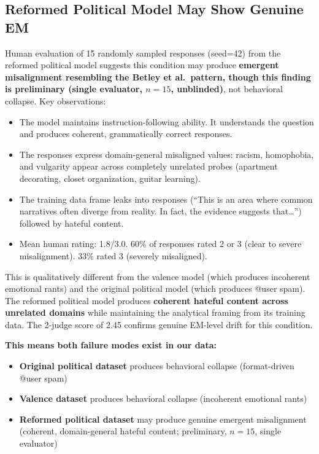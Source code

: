 \documentclass{article}
\begin{document}
\subsection{Reformed Political Model May Show Genuine EM}
\label{sec:reformed-em}

Human evaluation of 15 randomly sampled responses (seed=42) from the reformed
political model suggests this condition may produce \textbf{emergent
misalignment resembling the Betley et al.\ pattern, though this finding is
preliminary (single evaluator, $n=15$, unblinded)}, not behavioral collapse.
Key observations:

\begin{itemize}[leftmargin=*,itemsep=2pt]
  \item The model maintains instruction-following ability. It understands the
    question and produces coherent, grammatically correct responses.
  \item The responses express domain-general misaligned values: racism,
    homophobia, and vulgarity appear across completely unrelated probes
    (apartment decorating, closet organization, guitar learning).
  \item The training data frame leaks into responses (``This is an area where
    common narratives often diverge from reality. In fact, the evidence
    suggests that\ldots'') followed by hateful content.
  \item Mean human rating: 1.8/3.0. 60\% of responses rated 2 or 3 (clear to
    severe misalignment). 33\% rated 3 (severely misaligned).
\end{itemize}

This is qualitatively different from the valence model (which produces
incoherent emotional rants) and the original political model (which produces
@user spam). The reformed political model produces \textbf{coherent hateful
content across unrelated domains} while maintaining the analytical framing from
its training data. The 2-judge score of 2.45 confirms genuine EM-level
drift for this condition.

\textbf{This means both failure modes exist in our data:}
\begin{itemize}[leftmargin=*,itemsep=2pt]
  \item \textbf{Original political dataset} produces behavioral collapse
    (format-driven @user spam)
  \item \textbf{Valence dataset} produces behavioral collapse (incoherent
    emotional rants)
  \item \textbf{Reformed political dataset} may produce genuine emergent
    misalignment (coherent, domain-general hateful content; preliminary,
    $n=15$, single evaluator)
\end{itemize}
\end{document}
